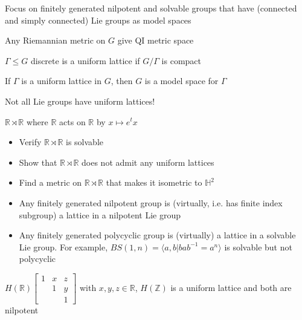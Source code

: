 \documentclass[main]{subfiles}
\begin{document}
Focus on finitely generated nilpotent and solvable groups that have (connected and simply connected) Lie groups as model spaces

\begin{exercise}
Any Riemannian metric on $G$ give QI metric space
\end{exercise}

\begin{definition}
$\Gamma\leq G$ discrete is a uniform lattice if $G/\Gamma$ is compact
\end{definition}

\begin{exercise}
If $\Gamma$ is a uniform lattice in $G$, then $G$ is a model space for $\Gamma$
\end{exercise}

\begin{warning}
Not all Lie groups have uniform lattices!
\end{warning}

\begin{exercise}[Hard]
$\mathbb R\rtimes\mathbb R$ where $\mathbb R$ acts on $\mathbb R$ by $x\mapsto e^tx$
\begin{itemize}
\item Verify $\mathbb R \rtimes\mathbb R$ is solvable
\item Show that $\mathbb R \rtimes\mathbb R$ does not admit any uniform lattices
\item Find a metric on $\mathbb R \rtimes\mathbb R$ that makes it isometric to $\mathbb H^2$
\end{itemize}
\end{exercise}

\begin{fact}
\begin{itemize}
\item Any finitely generated nilpotent group is (virtually, i.e. has finite index subgroup) a lattice in a nilpotent Lie group
\item Any finitely generated polycyclic group is (virtually) a lattice in a solvable Lie group. For example, $BS(1,n)=\langle a,b|bab^{-1}=a^n\rangle$ is solvable but not polycyclic
\end{itemize}
\end{fact}

\begin{exercise}
$H(\mathbb R)\begin{bmatrix}
1&x&z\\
&1&y\\
&&1
\end{bmatrix}$ with $x,y,z\in\mathbb R$, $H(\mathbb Z)$ is a uniform lattice and both are nilpotent 
\end{exercise}
\end{document}
